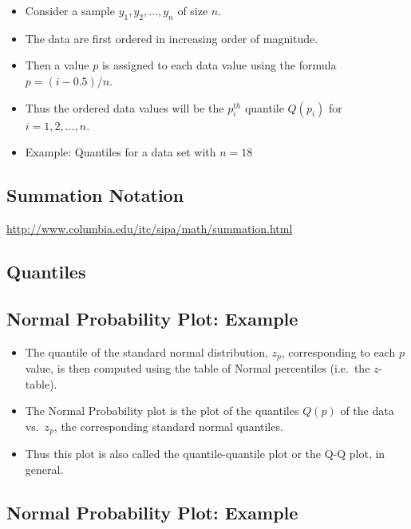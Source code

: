 \documentclass[
  letterpaper,
  DIV=11,
  numbers=noendperiod]{scrartcl}
\begin{document}
\begin{itemize}
\item
  Consider a sample \(y_1, y_2, \ldots, y_n\) of size \(n\).
\item
  The data are first ordered in increasing order of magnitude.
\item
  Then a value \(p\) is assigned to each data value using the formula
  \(p = (i -0.5)/n\).
\item
  Thus the ordered data values will be the \(p_i^{th}\) quantile
  \(Q(p_i)\) for \(i=1,2,\ldots,n.\)
\item
  Example: Quantiles for a data set with \(n = 18\)
\end{itemize}

\subsection{Summation Notation}\label{summation-notation}

\url{http://www.columbia.edu/itc/sipa/math/summation.html}

\subsection{Quantiles}\label{quantiles}

\subsection{Normal Probability Plot:
Example}\label{normal-probability-plot-example}

\begin{itemize}
\item
  The quantile of the standard normal distribution, \(z_p\),
  corresponding to each \(p\) value, is then computed using the table of
  Normal percentiles (i.e.~the \(z\)-table).
\item
  The Normal Probability plot is the plot of the quantiles \(Q(p)\) of
  the data vs.~\(z_p\), the corresponding standard normal quantiles.
\item
  Thus this plot is also called the quantile-quantile plot or the Q-Q
  plot, in general.
\end{itemize}

\subsection{Normal Probability Plot:
Example}\label{normal-probability-plot-example-1}
\end{document}
